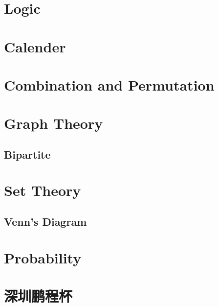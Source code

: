 \chapter{Logic}
\label{chap:logic}



\chapter{Calender}
\label{chap:calendar}

\chapter{Combination and Permutation}
\label{chap:combination-and-permutation}

\chapter{Graph Theory}
\label{chap:graph-theory}

\section{Bipartite}
\label{sec:bipartite}




\chapter{Set Theory}
\label{chap:set-theory}

\section{Venn's Diagram}
\label{sec:venn's-diagram}



\chapter{Probability}
\label{chap:probability}



\chapter{深圳鹏程杯}
\label{chap:pengchengbei}

